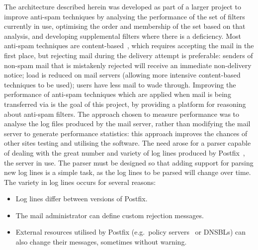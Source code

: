 \documentclass[draft]{svmult}
\begin{document}
The architecture described herein was developed as part of a larger project
to improve anti-spam techniques by analysing the performance of the set of
filters currently in use, optimising the order and membership of the set
based on that analysis, and developing supplemental filters where there is
a deficiency.  Most anti-spam techniques are
content-based~\cite{a-plan-for-spam, word-stemming, relaxed-online-svms},
which requires accepting the mail in the first place, but rejecting mail
during the delivery attempt is preferable: senders of non-spam mail that is
mistakenly rejected will receive an immediate non-delivery notice; load is
reduced on mail servers (allowing more intensive content-based techniques
to be used); users have less mail to wade through.  Improving the
performance of anti-spam techniques which are applied when mail is being
transferred via \SMTP{}\footnotemark{} is the goal of this project, by
providing a platform for reasoning about anti-spam filters.  The approach
chosen to measure performance was to analyse the log files produced by the
mail server, rather than modifying the mail server to generate performance
statistics: this approach improves the chances of other sites testing and
utilising the software.  The need arose for a parser capable of dealing
with the great number and variety of log lines produced by
Postfix~\cite{postfix}, the \SMTP{} server in use.  The parser must be
designed so that adding support for parsing new log lines is a simple task,
as the log lines to be parsed will change over time.  The variety in log
lines occurs for several reasons:

\begin{itemize}

    \item Log lines differ between versions of Postfix.
        
    \item The mail administrator can define custom rejection
        messages.

    \item External resources utilised by Postfix (e.g.\ policy
        servers~\cite{policy-servers} or DNSBLs) can also change their
        messages, sometimes without warning.

\end{itemize}
\end{document}
